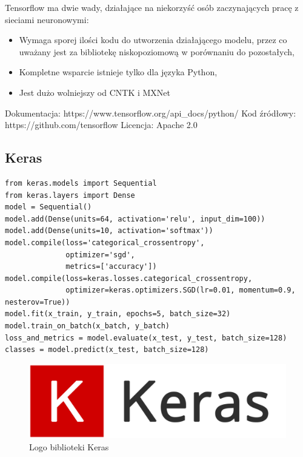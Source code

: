 \documentclass[12pt,a4paper,twoside,titlepage,openright]{book}
\begin{document}
Tensorflow ma dwie wady, działające na niekorzyść osób zaczynających pracę z sieciami neuronowymi:
\begin{itemize}
\item Wymaga sporej ilości kodu do utworzenia działającego modelu, przez co uważany jest za bibliotekę niskopoziomową w porównaniu do pozostałych,
\item Kompletne wsparcie istnieje tylko dla języka Python, 
\item Jest dużo wolniejszy od CNTK i MXNet \cite{DBLP:journals/corr/ShiWXC16}
\end{itemize}

\noindent
\newline 
Dokumentacja: https://www.tensorflow.org/api\_docs/python/
\newline 
Kod źródłowy: https://github.com/tensorflow
\newline 
Licencja: Apache 2.0

\subsection{Keras}


\noindent
\begin{minipage}{\linewidth}
\begin{lstlisting}[caption=Skrypt najprostszego modelu sekwencyjnego (Keras w 30 sekund), label=lst:test]
from keras.models import Sequential
from keras.layers import Dense
model = Sequential()
model.add(Dense(units=64, activation='relu', input_dim=100))
model.add(Dense(units=10, activation='softmax'))
model.compile(loss='categorical_crossentropy',
              optimizer='sgd',
              metrics=['accuracy'])
model.compile(loss=keras.losses.categorical_crossentropy,
              optimizer=keras.optimizers.SGD(lr=0.01, momentum=0.9, nesterov=True))
model.fit(x_train, y_train, epochs=5, batch_size=32)
model.train_on_batch(x_batch, y_batch)
loss_and_metrics = model.evaluate(x_test, y_test, batch_size=128)
classes = model.predict(x_test, batch_size=128)
\end{lstlisting}
\end{minipage}

\begin{figure}[ht]
	\centering
			\includegraphics[resolution=100, scale=0.3]{Keras.png}
		\caption{Logo biblioteki Keras}
\end{figure}
\end{document}
